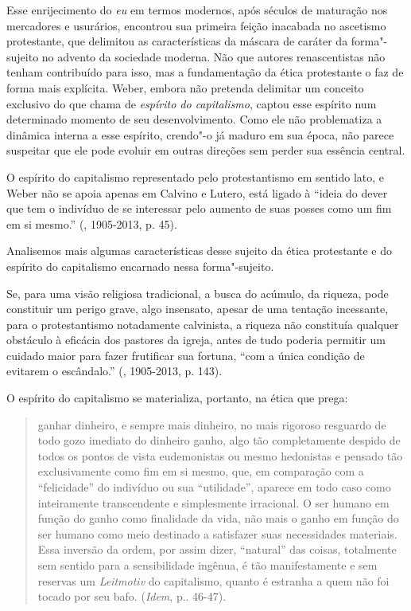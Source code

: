 Esse enrijecimento do \emph{eu} em termos modernos, após séculos de
maturação nos mercadores e usurários, encontrou sua primeira feição
inacabada no ascetismo protestante, que delimitou as características da
máscara de caráter da forma"-sujeito no advento da sociedade moderna. Não
que autores renascentistas não tenham contribuído para isso, mas a
fundamentação da ética protestante o faz de forma mais explícita. Weber,
embora não pretenda delimitar um conceito exclusivo do que chama de
\emph{espírito do capitalismo}, captou esse espírito num determinado
momento de seu desenvolvimento. Como ele não problematiza a dinâmica
interna a esse espírito, crendo"-o já maduro em sua época, não parece
suspeitar que ele pode evoluir em outras direções sem perder sua
essência central.

O espírito do capitalismo representado pelo protestantismo em sentido
lato, e Weber não se apoia apenas em Calvino e Lutero, está ligado à
``ideia do dever que tem o indivíduo de se interessar pelo aumento de
suas posses como um fim em si mesmo.'' (, 1905-2013, p. 45).

Analisemos mais algumas características desse sujeito da ética
protestante e do espírito do capitalismo encarnado nessa forma"-sujeito.

Se, para uma visão religiosa tradicional, a busca do acúmulo, da
riqueza, pode constituir um perigo grave, algo insensato, apesar de uma
tentação incessante, para o protestantismo notadamente calvinista, a
riqueza não constituía qualquer obstáculo à eficácia dos pastores da
igreja, antes de tudo poderia permitir um cuidado maior para fazer
frutificar sua fortuna, ``com a única condição de evitarem o
escândalo.'' (, 1905-2013, p. 143).

O espírito do capitalismo se materializa, portanto, na ética que prega:

\begin{quote}
ganhar dinheiro, e sempre mais dinheiro, no mais rigoroso resguardo de
todo gozo imediato do dinheiro ganho, algo tão completamente despido de
todos os pontos de vista eudemonistas ou mesmo hedonistas e pensado tão
exclusivamente como fim em si mesmo, que, em comparação com a
``felicidade'' do indivíduo ou sua ``utilidade'', aparece em todo caso
como inteiramente transcendente e simplesmente irracional. O ser humano
em função do ganho como finalidade da vida, não mais o ganho em função
do ser humano como meio destinado a satisfazer suas necessidades
materiais. Essa inversão da ordem, por assim dizer, ``natural'' das
coisas, totalmente sem sentido para a sensibilidade ingênua, é tão
manifestamente e sem reservas um \emph{Leitmotiv} do capitalismo, quanto
é estranha a quem não foi tocado por seu bafo. (\emph{Idem}, p.. 46-47).
\end{quote}

